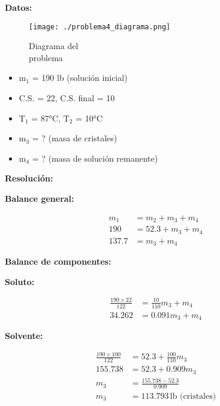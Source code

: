 \documentclass{article} %
\begin{document}
\begin{multicols}{2} %
\noindent\textbf{Datos:} %

\begin{figure}[H]
    \begin{minipage}[t]{0.3\textwidth} %
        \raggedright %
        \texttt{[image: ./problema4\_diagrama.png]} %
        \caption{Diagrama del \\ problema}
    \end{minipage}
\end{figure}

\textbf{} %
\begin{itemize}
\item m$_1$ = 190 lb (solución inicial)
\item C.S. = 22, C.S. final = 10
\item T$_1$ = 87°C, T$_2$ = 10°C
\item m$_3$ = ? (masa de cristales)
\item m$_4$ = ? (masa de solución remanente)
\end{itemize}

\columnbreak %

\noindent\textbf{Resolución:} %

\textbf{Balance general:}

\begin{align*}
    m_1 &= m_2 + m_3 + m_4 \\[10pt]
    190 &= 52.3 + m_3 + m_4 \\[10pt]
    137.7 &= m_3 + m_4
\end{align*}

\textbf{Balance de componentes:}

\textbf{Soluto:}

\begin{align*}
    \frac{190 \times 22}{122} &= \frac{10}{110}m_3 + m_4 \\[10pt]
    34.262 &= 0.091 m_3 + m_4
\end{align*}

\textbf{Solvente:}

\begin{align*}
    \frac{190 \times 100}{122} &= 52.3 + \frac{100}{110} m_3 \\[10pt]
    155.738 &= 52.3 + 0.909 m_3 \\[10pt]
    m_3 &= \frac{155.738 - 52.3}{0.909} \\[10pt]
    m_3 &= 113.793 \, \text{lb (cristales)}
\end{align*}


\end{multicols}
\end{document}
